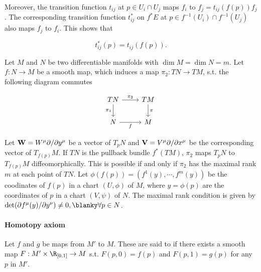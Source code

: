 Moreover, the transition function $t_{ij}$ at $p \in U_i \cap U_j$ maps $f_i$ to $f_j = t_{ij}(f(p)) f_j$.
The corresponding transition function $t_{ij}^{*}$ on $f^* E$ at $p \in f^{-1}(U_i) \cap f^{-1}(U_j)$ also maps $f_j$ to $f_i$.
This shows that 

$$
    t_{ij}^{*}(p) = t_{ij}(f(p)). 
$$


\begin{mdframed}[style=MyFrame]

    Let $M$ and $N$ be two differentiable manifolds with $\dim M = \dim N = m$.
    Let $f: N \rightarrow M$ be a smooth map, which induces a map $\pi_2: TN \rightarrow TM$, s.t. the following diagram commutes 

    \[
        \begin{tikzcd}
	   {TN} & TM \\
	   {N} & M
	   \arrow["{\pi_1}"', from=1-1, to=2-1]
	   \arrow["f"', from=2-1, to=2-2]
	   \arrow["\pi", from=1-2, to=2-2]
	   \arrow["\pi_2", from=1-1, to=1-2]
        \end{tikzcd}
    \]

    Let ${\bf W} = W^{\mu} \partial/\partial y^\mu$ be a vector of $T_pN$ and ${\bf V} = V^{\mu} \partial/\partial x^\mu$ be the corresponding vector of $T_{f(p)}M$.
    If $TN$ is the pullback bundle $f^{*}(TM)$, $\pi_2$ maps $T_pN$ to $T_{f(p)}M$ diffeomorphically.
    This is possible if and only if $\pi_2$ has the maximal rank $m$ at each point of $TN$.
    Let $\phi(f(p)) = (f^{1}(y), \cdots, f^m(y))$ be the coodinates of $f(p)$ in a chart $(U, \phi)$ of $M$, where $y = \phi(p)$ are the coordinates of $p$ in a chart $(V, \psi)$ of $N$.
    The maximal rank condition is given by $\det ( \partial f^\mu (y) / \partial y^{\nu}) \neq 0, \blanky \forall p \in N$. 
    
\end{mdframed}

\smallbreak

\paragraph{Homotopy axiom}

\begin{df}

    Let $f$ and $g$ be maps from $M'$ to $M$. These are said to  if there exists a smooth map $F: M' \times \R_{[0,1]} \rightarrow M$ s.t. $F(p,0) = f(p)$ and $F(p,1) = g(p)$ for any $p$ in $M'$. 
    
\end{df}

